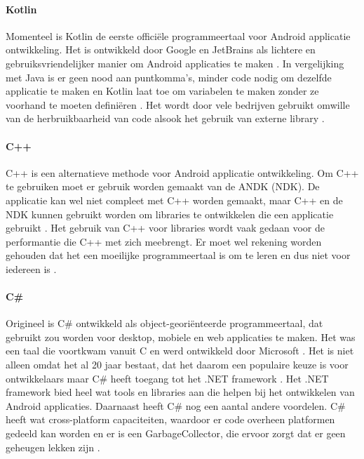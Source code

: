 \paragraph{Kotlin}
Momenteel is Kotlin de eerste officiële programmeertaal voor Android applicatie ontwikkeling. 
Het is ontwikkeld door Google en \Gls{JetBrains} als lichtere en gebruiksvriendelijker 
manier om Android applicaties te maken \autocite{Thorndyke2021}. In vergelijking met Java 
is er geen nood aan puntkomma's, minder code nodig om dezelfde applicatie te maken en Kotlin 
laat toe om variabelen te maken zonder ze voorhand te moeten definiëren \autocite{Thorndyke2021}. 
Het wordt door vele bedrijven gebruikt omwille van de herbruikbaarheid van code alsook het 
gebruik van externe \Gls{library} \autocite{Kesavan2021}.

\paragraph{C++}
C++ is een alternatieve methode voor Android applicatie ontwikkeling. Om C++ te gebruiken 
moet er gebruik worden gemaakt van de \Gls{ANDK} (NDK). De applicatie kan wel niet compleet 
met C++ worden gemaakt, maar C++ en de NDK kunnen gebruikt worden om libraries te ontwikkelen 
die een applicatie gebruikt \autocite{harkiran2022}. Het gebruik van C++ voor libraries wordt 
vaak gedaan voor de performantie die C++ met zich meebrengt. Er moet wel rekening worden 
gehouden dat het een moeilijke programmeertaal is om te leren en dus niet voor iedereen is 
\autocite{Designveloper2022}.

\paragraph{C\#}\label{pa:csharp}
Origineel is C\# ontwikkeld als object-georiënteerde programmeertaal, dat gebruikt zou 
worden voor desktop, mobiele en web applicaties te maken. Het was een taal die voortkwam 
vanuit C en werd ontwikkeld door Microsoft \autocite{Designveloper2022}. Het is niet alleen 
omdat het al 20 jaar bestaat, dat het daarom een populaire keuze is voor ontwikkelaars 
maar C\# heeft toegang tot het .NET framework \autocite{Kesavan2021}. Het .NET framework 
bied heel wat tools en libraries aan die helpen bij het ontwikkelen van Android applicaties. 
Daarnaast heeft C\# nog een aantal andere voordelen. C\# heeft wat cross-platform 
capaciteiten, waardoor er code overheen platformen gedeeld kan worden en er is een 
\Gls{GarbageCollector}, die ervoor zorgt dat er geen geheugen lekken zijn \autocite{Patel2023}.

